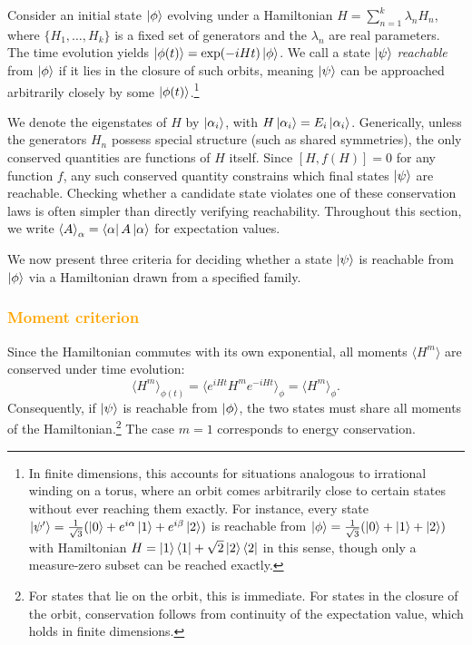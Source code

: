 \documentclass[aps,prx,reprint,superscriptaddress,footnote, twocolumn,notitlepage]{revtex4-2}
\newcommand{\ko}[1]{\textcolor{orange}{#1}}
\newcommand{\todoko}[1]{\ko{$\diamondsuit$ #1}}
\begin{document}

Consider an initial state $\ket{\phi}$ evolving under a Hamiltonian $H = \sum_{n=1}^{k} \lambda_n H_n$, where $\{H_1, \ldots, H_k\}$ is a fixed set of generators and the $\lambda_n$ are real parameters. The time evolution yields $\ket{\phi(t)} = \exp(-iHt)\ket{\phi}$. We call a state $\ket{\psi}$ \emph{reachable} from $\ket{\phi}$ if it lies in the closure of such orbits, meaning $\ket{\psi}$ can be approached arbitrarily closely by some $\ket{\phi(t)}$.\footnote{In finite dimensions, this accounts for situations analogous to irrational winding on a torus, where an orbit comes arbitrarily close to certain states without ever reaching them exactly. For instance, every state $\ket{\psi'} = \frac{1}{\sqrt{3}}(\ket{0} + e^{i\alpha}\ket{1} + e^{i\beta}\ket{2})$ is reachable from $\ket{\phi} = \frac{1}{\sqrt{3}}(\ket{0} + \ket{1} + \ket{2})$ with Hamiltonian $H = \ket{1}\bra{1} + \sqrt{2}\ket{2}\bra{2}$ in this sense, though only a measure-zero subset can be reached exactly.}

We denote the eigenstates of $H$ by $\ket{\alpha_i}$, with $H\ket{\alpha_i} = E_i\ket{\alpha_i}$. Generically, unless the generators $H_n$ possess special structure (such as shared symmetries), the only conserved quantities are functions of $H$ itself. Since $[H, f(H)] = 0$ for any function $f$, any such conserved quantity constrains which final states $\ket{\psi}$ are reachable. Checking whether a candidate state violates one of these conservation laws is often simpler than directly verifying reachability. Throughout this section, we write $\braket{A}_\alpha = \bra{\alpha}A\ket{\alpha}$ for expectation values.

We now present three criteria for deciding whether a state $\ket{\psi}$
 is reachable from $\ket{\phi}$ via a Hamiltonian drawn from a specified family.
\subsubsection{\ko{Moment criterion}}

Since the Hamiltonian commutes with its own exponential, all moments $\langle H^m \rangle$ are conserved under time evolution:
\begin{equation}
    \langle H^m \rangle_{\phi(t)} = \langle e^{iHt} H^m e^{-iHt} \rangle_\phi = \langle H^m \rangle_\phi.
\end{equation}
Consequently, if $\ket{\psi}$ is reachable from $\ket{\phi}$, the two states must share all moments of the Hamiltonian.\footnote{For states that lie on the orbit, this is immediate. For states in the closure of the orbit, conservation follows from continuity of the expectation value, which holds in finite dimensions.} The case $m=1$ corresponds to energy conservation.
\end{document}
